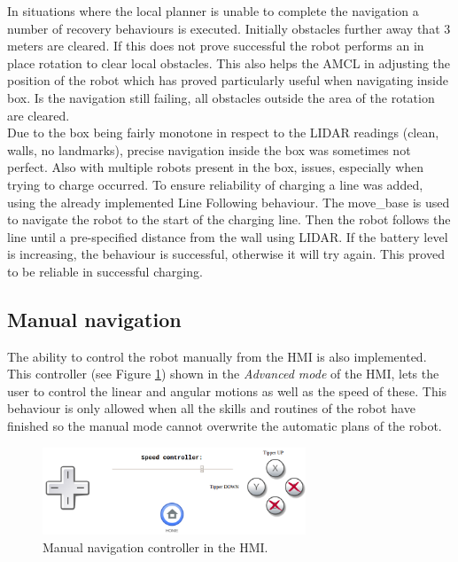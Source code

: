 	In situations where the local planner is unable to complete the navigation a number of recovery behaviours is executed. Initially obstacles further away that 3 meters are cleared. If this does not prove successful the robot performs an in place rotation to clear local obstacles. This also helps the AMCL in adjusting the position of the robot which has proved particularly useful when navigating inside box. Is the navigation still failing, all obstacles outside the area of the rotation are cleared. 
    \\
    Due to the box being fairly monotone in respect to the LIDAR readings (clean, walls, no landmarks), precise navigation inside the box was sometimes not perfect. 
    Also with multiple robots present in the box, issues, especially when trying to charge occurred. 
    To ensure reliability of charging a line was added, using the already implemented Line Following behaviour. 
    The move{\_}base is used to navigate the robot to the start of the charging line. 
    Then the robot follows the line until a pre-specified distance from the wall using LIDAR. 
    If the battery level is increasing, the behaviour is successful, otherwise it will try again. This proved to be reliable in successful charging.\\

    \subsection{Manual navigation} %
    \label{sub:mr_manual_navigation}
    The ability to control the robot manually from the HMI is also implemented.
    This controller (see Figure \ref{fig:mr_manual_navigation}) shown in the \emph{Advanced mode} of the HMI, lets the user to control the linear and angular motions as well as the speed of these.
    This behaviour is only allowed when all the skills and routines of the robot have finished so the manual mode cannot overwrite the automatic plans of the robot.

    \begin{figure}[H]
        \centering
        \includegraphics[width=0.7\textwidth]{figs/manual_navigation}
        \caption{Manual navigation controller in the HMI.}
        \label{fig:mr_manual_navigation}
    \end{figure}
    

